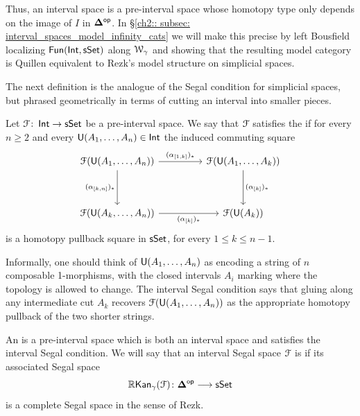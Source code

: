 Thus, an interval space is a pre-interval space whose homotopy type only depends on the image of $I$ in $\mathbf\Delta^{\mathsf{op}}$. In §\ref{ch2:: subsec: interval_spaces_model_infinity_cats} we will make this precise by
left Bousfield localizing $\operatorname{{\sf Fun}}(\operatorname{\mathsf{Int}},\operatorname{\sf sSet})$ along $\mathcal W_{\gamma}$ and showing that the resulting model category is Quillen equivalent to Rezk's model structure on simplicial spaces.

The next definition is the analogue of the Segal condition for simplicial spaces, but phrased geometrically in terms of cutting an interval into smaller pieces.

\begin{definition}\label{ch2:: def: interval Segal condition}
Let $\mathcal F\colon \operatorname{\mathsf{Int}} \to \operatorname{\sf sSet}$ be a pre-interval space. We say that $\mathcal F$ satisfies the  if for every $n \geq 2$ and every $\mathsf U(A_1,\ldots,A_n)\in\operatorname{\mathsf{Int}}$ the induced
commuting square
\begin{equation}
    \begin{tikzcd}[ampersand replacement=\&,column sep=2.25em]
        {\cF(\sU(A_1,\ldots, A_n))} \&\& {\cF(\sU(A_1,\ldots, A_k))} \\
        \\
        {\cF(\sU(A_k,\ldots, A_n))} \&\& {\cF(\sU(A_k))}
        \arrow["{(\alpha_{[1,k]})_*}", from=1-1, to=1-3]
        \arrow["{(\alpha_{[k,n]})_*}"', from=1-1, to=3-1]
        \arrow["{(\alpha_{[k]})_*}", from=1-3, to=3-3]
        \arrow["{(\alpha_{[k]})_*}"', from=3-1, to=3-3]
    \end{tikzcd}
\end{equation}
is a homotopy pullback square in $\operatorname{\sf sSet}$, for every $1 \le k \le n-1$.
\end{definition}

Informally, one should think of $\mathsf U(A_1,\ldots,A_n)$ as encoding a string of $n$ composable 1-morphisms, with the closed intervals $A_i$ marking where the topology is allowed to change. The interval Segal condition says that gluing along any intermediate cut $A_k$ recovers $\mathcal F(\mathsf U(A_1,\ldots,A_n))$
as the appropriate homotopy pullback of the two shorter strings.

\begin{definition}
An  is a pre-interval space which is both an interval space and satisfies the interval Segal condition. We will say that an interval Segal space $\mathcal F$ is  if its associated
Segal space
\begin{equation}
  \operatorname{\mathbb{R}\mathsf{Kan}}_{\gamma}(\mathcal F)\colon \mathbf\Delta^{\mathsf{op}} \longrightarrow \operatorname{\sf sSet}
\end{equation}
is a complete Segal space in the sense of Rezk.   
\end{definition}

